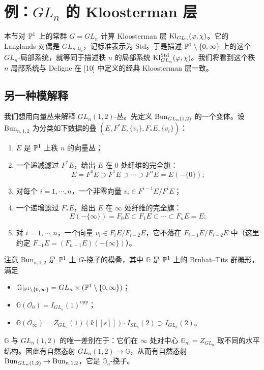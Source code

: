 
\section{例：$GL_n$ 的 Kloosterman 层}

本节对 $\mathbb{P}^1$ 上的常群 $G=GL_n$ 计算 Kloosterman 层 $\mathrm{Kl}_{GL_n}(\varphi,\chi)$。它的 Langlands 对偶是 $GL_{n,\mathbb{Q}_\ell}$，记标准表示为 $\mathrm{Std}$。于是描述 $\mathbb{P}^1\setminus\{0,\infty\}$ 上的这个 $GL_n$-局部系统，就等同于描述秩 $n$ 的局部系统 $\mathrm{Kl}^{\mathrm{Std}}_{GL_n}(\varphi,\chi)$。我们将看到这个秩 $n$ 局部系统与 Deligne 在 [10] 中定义的经典 Kloosterman 层一致。

\subsection{另一种模解释}

我们想用向量丛来解释 $GL_n(1,2)$-丛。先定义 $\mathrm{Bun}_{GL_n(1,2)}$ 的一个变体。设 $\mathrm{Bun}_{n,1,2}$ 为分类如下数据的叠 $(E,F^*E,\{v_i\},F_*E,\{v_i\})$：
\begin{enumerate}[label=(\arabic*), leftmargin=1.9em, itemsep=.15em]
\item $E$ 是 $\mathbb{P}^1$ 上秩 $n$ 的向量丛；
\item 一个递减滤过 $F^*E$，给出 $E$ 在 $0$ 处纤维的完全旗：
\[
E=F^0E\supset F^1E\supset\cdots\supset F^nE=E(-\{0\});
\]
\item 对每个 $i=1,\cdots,n$，一个非零向量 $v_i\in F^{i-1}E/F^iE$；
\item 一个递增滤过 $F_*E$，给出 $E$ 在 $\infty$ 处纤维的完全旗：
\[
E(-\{\infty\})=F_0E\subset F_1E\subset\cdots\subset F_nE=E;
\]
\item 对 $i=1,\cdots,n$，一个向量 $v_i\in F_iE/F_{i-2}E$，它不落在 $F_{i-1}E/F_{i-2}E$ 中（这里约定 $F_{-1}E=(F_{n-1}E)(-\{\infty\})$）。
\end{enumerate}
注意 $\mathrm{Bun}_{n,1,2}$ 是 $\mathbb{P}^1$ 上 $G$-挠子的模叠，其中 $\mathbb{G}$ 是 $\mathbb{P}^1$ 上的 Bruhat--Tits 群概形，满足
\begin{itemize}[leftmargin=1.6em, itemsep=.15em]
\item $\mathbb{G}|_{\mathbb{P}^1\setminus\{0,\infty\}}=GL_n\times(\mathbb{P}^1\setminus\{0,\infty\})$；
\item $\mathbb{G}(\mathcal O_0)=I_{GL_n}(1)^{\mathrm{opp}}$；
\item $\mathbb{G}(\mathcal O_\infty)=Z_{GL_n}(1)(k[[s]])\cdot I_{SL_n}(2)\supset I_{GL_n}(2)$。
\end{itemize}
$\mathbb{G}$ 与 $GL_n(1,2)$ 的唯一差别在于：它们在 $\infty$ 处对中心 $\mathbb{G}_m=Z_{GL_n}$ 取不同的水平结构。因此有自然态射 $GL_n(1,2)\to\mathbb{G}$，从而有自然态射 $\mathrm{Bun}_{GL_n(1,2)}\to\mathrm{Bun}_{n,1,2}$，它是 $\mathbb{G}_a$-挠子。

